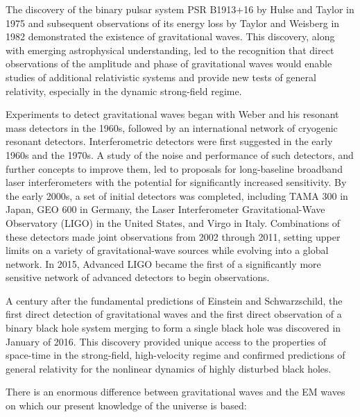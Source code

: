 \documentclass[a4paper,10pt]{article}
\begin{document}
{\noindent}The discovery of the binary pulsar system PSR B1913+16 by Hulse and Taylor in 1975 and subsequent observations of its energy loss by Taylor and Weisberg in 1982 demonstrated the existence of gravitational waves. This discovery, along with emerging astrophysical understanding, led to the recognition that direct observations of the amplitude and phase of gravitational waves would enable studies of additional relativistic systems and provide new tests of general relativity, especially in the dynamic strong-field regime.

{\noindent}Experiments to detect gravitational waves began with Weber and his resonant mass detectors in the 1960s, followed by an international network of cryogenic resonant detectors. Interferometric detectors were first suggested in the early 1960s and the 1970s. A study of the noise and performance of such detectors, and further concepts to improve them, led to proposals for long-baseline broadband laser interferometers with the potential for significantly increased sensitivity. By the early 2000s, a set of initial detectors was completed, including TAMA 300 in Japan, GEO 600 in Germany, the Laser Interferometer Gravitational-Wave Observatory (LIGO) in the United States, and Virgo in Italy. Combinations of these detectors made joint observations from 2002 through 2011, setting upper limits on a variety of gravitational-wave sources while evolving into a global network. In 2015, Advanced LIGO became the first of a significantly more sensitive network of advanced detectors to begin observations.

{\noindent}A century after the fundamental predictions of Einstein and Schwarzschild, the first direct detection of gravitational waves and the first direct observation of a binary black hole system merging to form a single black hole was discovered in January of 2016. This discovery provided unique access to the properties of space-time in the strong-field, high-velocity regime and confirmed predictions of general relativity for the nonlinear dynamics of highly disturbed black holes.

{\noindent}There is an enormous difference between gravitational waves and the EM waves on which our present knowledge of the universe is based:
\end{document}
